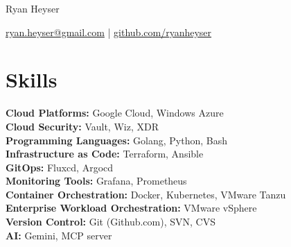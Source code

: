 \documentclass[11pt]{article}       %
\begin{document}
\centerline{\Huge Ryan Heyser}

\vspace{5pt}

\centerline{\href{mailto:ryan.heyser@gmail.com}{ryan.heyser@gmail.com} | \href{github.com/ryanheyser}{github.com/ryanheyser}}

\vspace{-10pt}

\section*{Skills}
\textbf{Cloud Platforms:} Google Cloud, Windows Azure \\
\textbf{Cloud Security:} Vault, Wiz, XDR \\
\textbf{Programming Languages:} Golang, Python, Bash \\
\textbf{Infrastructure as Code:} Terraform, Ansible \\
\textbf{GitOps:} Fluxcd, Argocd \\
\textbf{Monitoring Tools:} Grafana, Prometheus \\
\textbf{Container Orchestration:} Docker, Kubernetes, VMware Tanzu \\
\textbf{Enterprise Workload Orchestration:} VMware vSphere \\
\textbf{Version Control:} Git (Github.com), SVN, CVS \\
\textbf{AI:} Gemini, MCP server

\vspace{-6.5pt}

\end{document}
